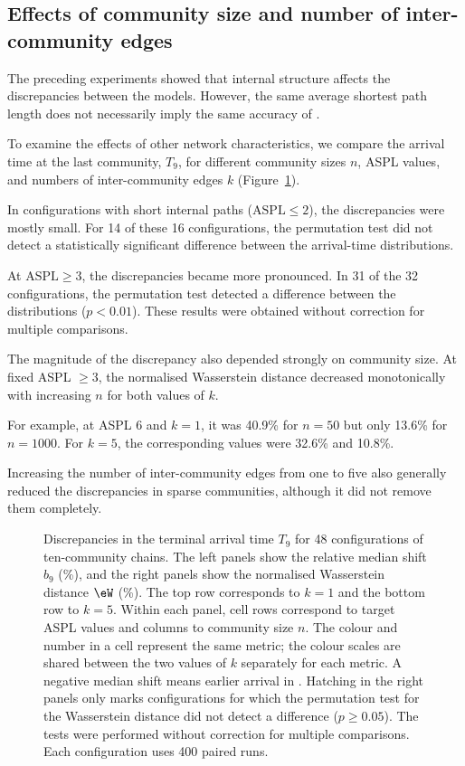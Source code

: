 \subsection{Effects of community size and number of inter-community edges}
\label{sec:res_size}

The preceding experiments showed that internal structure affects the discrepancies between the models. However, the same average shortest path length does not necessarily imply the same accuracy of \TS{}.

To examine the effects of other network characteristics, we compare the arrival time at the last community, $T_9$, for different community sizes $n$, ASPL values, and numbers of inter-community edges $k$ (Figure~\ref{fig:accuracy_map}).

In configurations with short internal paths ($\mathrm{ASPL}\leq2$), the discrepancies were mostly small. For 14 of these 16 configurations, the permutation test did not detect a statistically significant difference between the arrival-time distributions.

At $\mathrm{ASPL}\geq3$, the discrepancies became more pronounced. In 31 of the 32 configurations, the permutation test detected a difference between the distributions ($p<0.01$). These results were obtained without correction for multiple comparisons.

The magnitude of the discrepancy also depended strongly on community size. At fixed ASPL $\geq3$, the normalised Wasserstein distance decreased monotonically with increasing $n$ for both values of $k$.

For example, at ASPL 6 and $k=1$, it was 40.9\% for $n=50$ but only 13.6\% for $n=1000$. For $k=5$, the corresponding values were 32.6\% and 10.8\%.

Increasing the number of inter-community edges from one to five also generally reduced the discrepancies in sparse communities, although it did not remove them completely.

\begin{figure}[tbp]
\centering
\caption{%
Discrepancies in the terminal arrival time $T_9$ for 48 configurations of ten-community chains.
The left panels show the relative median shift $b_9$ (\%), and the right panels show the normalised Wasserstein distance $\eW$ (\%). The top row corresponds to $k=1$ and the bottom row to $k=5$.
Within each panel, cell rows correspond to target ASPL values and columns to community size $n$.
The colour and number in a cell represent the same metric; the colour scales are shared between the two values of $k$ separately for each metric.
A negative median shift means earlier arrival in \TS{}.
Hatching in the right panels only marks configurations for which the permutation test for the Wasserstein distance did not detect a difference ($p\geq0.05$).
The tests were performed without correction for multiple comparisons.
Each configuration uses 400 paired runs.
}
\label{fig:accuracy_map}
\end{figure}

